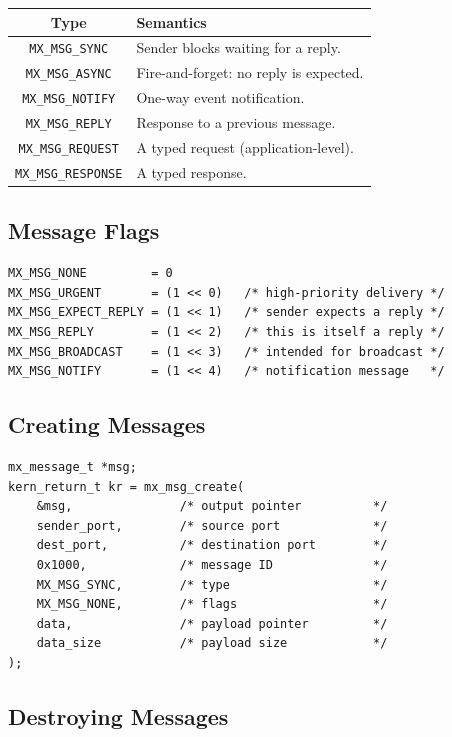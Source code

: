 \documentclass[a4paper,11pt]{article}
\begin{document}
\begin{center}
\begin{tabularx}{\textwidth}{|c|X|}
\hline
\textbf{Type} & \textbf{Semantics} \\
\hline
\texttt{MX\_MSG\_SYNC}    & Sender blocks waiting for a reply.\\
\texttt{MX\_MSG\_ASYNC}   & Fire-and-forget: no reply is expected.\\
\texttt{MX\_MSG\_NOTIFY}  & One-way event notification.\\
\texttt{MX\_MSG\_REPLY}   & Response to a previous message.\\
\texttt{MX\_MSG\_REQUEST} & A typed request (application-level).\\
\texttt{MX\_MSG\_RESPONSE}& A typed response.\\
\hline
\end{tabularx}
\end{center}

\subsection{Message Flags}

\begin{lstlisting}
MX_MSG_NONE         = 0
MX_MSG_URGENT       = (1 << 0)   /* high-priority delivery */
MX_MSG_EXPECT_REPLY = (1 << 1)   /* sender expects a reply */
MX_MSG_REPLY        = (1 << 2)   /* this is itself a reply */
MX_MSG_BROADCAST    = (1 << 3)   /* intended for broadcast */
MX_MSG_NOTIFY       = (1 << 4)   /* notification message   */
\end{lstlisting}

\subsection{Creating Messages}

\begin{lstlisting}
mx_message_t *msg;
kern_return_t kr = mx_msg_create(
    &msg,               /* output pointer          */
    sender_port,        /* source port             */
    dest_port,          /* destination port        */
    0x1000,             /* message ID              */
    MX_MSG_SYNC,        /* type                    */
    MX_MSG_NONE,        /* flags                   */
    data,               /* payload pointer         */
    data_size           /* payload size            */
);
\end{lstlisting}

\subsection{Destroying Messages}
\end{document}
